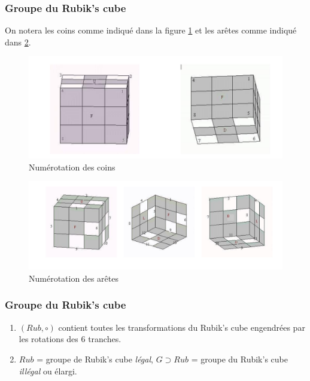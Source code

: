 \documentclass[10pt,notheorems]{beamer}
\theoremstyle{plain}
\theoremstyle{definition}
\theoremstyle{plain}
\theoremstyle{plain}
\theoremstyle{plain}
\theoremstyle{remark}
\begin{document}
\begin{frame}
  \frametitle{Groupe du Rubik's cube}
  On notera les coins comme indiqué dans la figure \ref{num_coins} et les arêtes comme indiqué dans \ref{num_aretes}.

  \begin{figure}
    \centering
    \includegraphics[scale=0.1]{figures/num_coins.png}
    \caption{Numérotation des coins}
    \label{num_coins}
  \end{figure}

  \begin{figure}
    \centering
    \includegraphics[scale=0.1]{figures/num_aretes.png}
    \caption{Numérotation des arêtes}
    \label{num_aretes}
  \end{figure}
\end{frame}



\begin{frame}
  \frametitle{Groupe du Rubik's cube}
  \begin{enumerate}
    \item $(Rub, \circ)$ contient toutes les transformations du Rubik's cube engendrées par les rotations des 6 tranches.
    \item $Rub$ = groupe de Rubik's cube \emph{légal}, $G \supset Rub$ = groupe du Rubik's cube \emph{illégal} ou élargi.
  \end{enumerate}
\end{frame}
\end{document}
